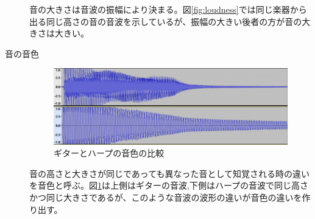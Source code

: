 \begin{description}
音の大きさは音波の振幅により決まる。図\ref{fig:loudness}では同じ楽器から出る同じ高さの音の音波を示しているが、振幅の大きい後者の方が音の大きさは大きい。

\item[音の音色]\mbox{}

\begin{figure}[t]
\begin{center}
\includegraphics[width=0.7\hsize]{figure/c4_guitar_harp.png}
\caption{ギターとハープの音色の比較}
\label{fig:guitar_harp_comp}
\end{center}
\end{figure}

音の高さと大きさが同じであっても異なった音として知覚される時の違いを音色と呼ぶ。図\ref{fig:guitar_harp_comp}は上側はギターの音波,下側はハープの音波で同じ高さかつ同じ大きさであるが、このような音波の波形の違いが音色の違いを作り出す。

\end{description}